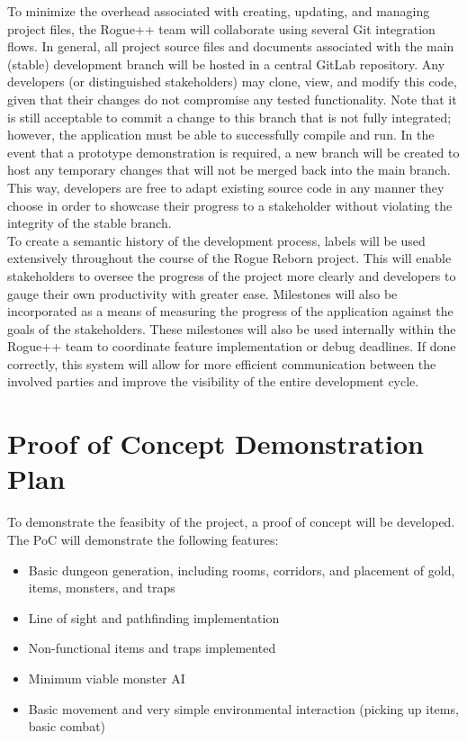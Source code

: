 \documentclass{article}
\begin{document}
To minimize the overhead associated with creating, updating, and managing project files, the Rogue++ team will collaborate using several Git integration flows.  In general, all project source files and documents associated with the main (stable) development branch will be hosted in a central GitLab repository.  Any developers (or distinguished stakeholders) may clone, view, and modify this code, given that their changes do not compromise any tested functionality.  Note that it is still acceptable to commit a change to this branch that is not fully integrated; however, the application must be able to successfully compile and run.  In the event that a prototype demonstration is required, a new branch will be created to host any temporary changes that will not be merged back into the main branch.  This way, developers are free to adapt existing source code in any manner they choose in order to showcase their progress to a stakeholder without violating the integrity of the stable branch.\\

To create a semantic history of the development process, labels will be used extensively throughout the course of the Rogue Reborn project.  This will enable stakeholders to oversee the progress of the project more clearly and developers to gauge their own productivity with greater ease.  Milestones will also be incorporated as a means of measuring the progress of the application against the goals of the stakeholders.  These milestones will also be used internally within the Rogue++ team to coordinate feature implementation or debug deadlines. If done correctly, this system will allow for more efficient communication between the involved parties and improve the visibility of the entire development cycle.

\section{Proof of Concept Demonstration Plan}

To demonstrate the feasibity of the project, a proof of concept will be developed. The PoC will demonstrate the following features:

\begin{itemize}
	\item Basic dungeon generation, including rooms, corridors, and placement of gold, items, monsters, and traps
	\item Line of sight and pathfinding implementation
	\item Non-functional items and traps implemented
	\item Minimum viable monster AI
	\item Basic movement and very simple environmental interaction (picking up items, basic combat)
\end{itemize}
\end{document}
